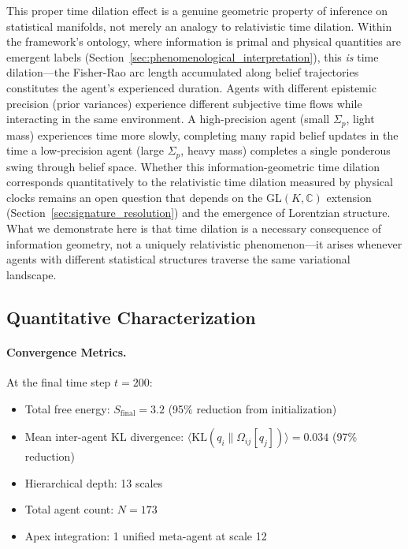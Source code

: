 \documentclass[11pt]{article}
\begin{document}
This proper time dilation effect is a genuine geometric property of inference on statistical manifolds, not merely an analogy to relativistic time dilation. Within the framework's ontology, where information is primal and physical quantities are emergent labels (Section~\ref{sec:phenomenological_interpretation}), this \emph{is} time dilation---the Fisher-Rao arc length accumulated along belief trajectories constitutes the agent's experienced duration. Agents with different epistemic precision (prior variances) experience different subjective time flows while interacting in the same environment. A high-precision agent (small $\Sigma_p$, light mass) experiences time more slowly, completing many rapid belief updates in the time a low-precision agent (large $\Sigma_p$, heavy mass) completes a single ponderous swing through belief space. Whether this information-geometric time dilation corresponds quantitatively to the relativistic time dilation measured by physical clocks remains an open question that depends on the GL$(K, \mathbb{C})$ extension (Section~\ref{sec:signature_resolution}) and the emergence of Lorentzian structure. What we demonstrate here is that time dilation is a necessary consequence of information geometry, not a uniquely relativistic phenomenon---it arises whenever agents with different statistical structures traverse the same variational landscape.



\subsection{Quantitative Characterization}

\paragraph{Convergence Metrics.}
At the final time step $t = 200$:
\begin{itemize}
\item Total free energy: $S_{\text{final}} = 3.2$ (95\% reduction from initialization)
\item Mean inter-agent KL divergence: $\langle\mathrm{KL}(q_i\|\Omega_{ij}[q_j])\rangle = 0.034$ (97\% reduction)
\item Hierarchical depth: 13 scales
\item Total agent count: $N = 173$
\item Apex integration: 1 unified meta-agent at scale 12
\end{itemize}
\end{document}
